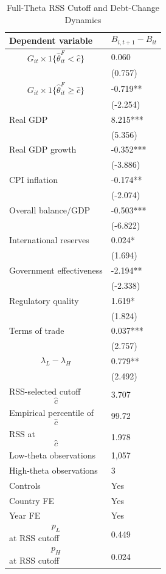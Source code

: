 \begin{table}[H]\centering
\begin{threeparttable}
\caption{Full-Theta RSS Cutoff and Debt-Change Dynamics}
\label{tab:deltaB_rss_cutoff_fulltheta}
\scriptsize
\begin{tabularx}{\textwidth}{lY}
\toprule
Dependent variable & $$B_{i,t+1}-B_{it}$$ \\
\midrule
$$G_{it}\times 1\{\widehat{\theta}^{F}_{it}<\widehat{c}\}$$ & 0.060 \\
 & (0.757) \\
$$G_{it}\times 1\{\widehat{\theta}^{F}_{it}\geq\widehat{c}\}$$ & -0.719** \\
 & (-2.254) \\
Real GDP & 8.215*** \\
 & (5.356) \\
Real GDP growth & -0.352*** \\
 & (-3.886) \\
CPI inflation & -0.174** \\
 & (-2.074) \\
Overall balance/GDP & -0.503*** \\
 & (-6.822) \\
International reserves & 0.024* \\
 & (1.694) \\
Government effectiveness & -2.194** \\
 & (-2.338) \\
Regulatory quality & 1.619* \\
 & (1.824) \\
Terms of trade & 0.037*** \\
 & (2.757) \\
$$\lambda_L-\lambda_H$$ & 0.779** \\
 & (2.492) \\
\midrule
RSS-selected cutoff $$\widehat{c}$$ & 3.707 \\
Empirical percentile of $$\widehat{c}$$ & 99.72 \\
RSS at $$\widehat{c}$$ & 1.978 \\
Low-theta observations & 1,057 \\
High-theta observations & 3 \\
Controls & Yes \\
Country FE & Yes \\
Year FE & Yes \\
$$p_L$$ at RSS cutoff & 0.449 \\
$$p_H$$ at RSS cutoff & 0.024 \\

\end{tabularx}
\end{threeparttable}
\end{table}
